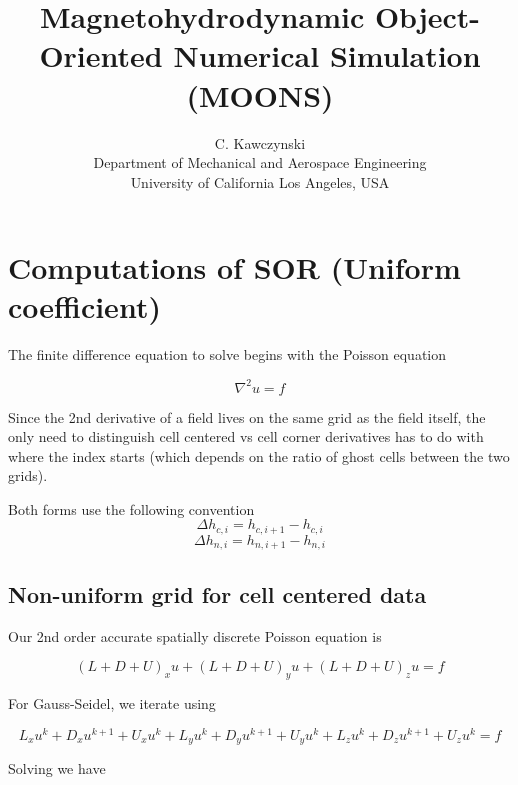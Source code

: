 \documentclass[11pt]{article}
\begin{document}
\doublespacing
\title{Magnetohydrodynamic Object-Oriented Numerical Simulation (MOONS)}
\author{C. Kawczynski \\
Department of Mechanical and Aerospace Engineering \\
University of California Los Angeles, USA\\
}
\maketitle

\section{Computations of SOR (Uniform coefficient)}
The finite difference equation to solve begins with the Poisson equation


\begin{equation}
	\nabla^2 u = f
\end{equation}

Since the 2nd derivative of a field lives on the same grid as the field itself, the only need to distinguish cell centered vs cell corner derivatives has to do with where the index starts (which depends on the ratio of ghost cells between the two grids).

Both forms use the following convention
\begin{equation}
	\Delta h_{c,i} = h_{c,i+1} - h_{c,i}
\end{equation}
\begin{equation}
	\Delta h_{n,i} = h_{n,i+1} - h_{n,i}
\end{equation}

\subsection{Non-uniform grid for cell centered data}
Our 2nd order accurate spatially discrete Poisson equation is

\begin{equation}
	(L + D + U)_x u +
	(L + D + U)_y u +
	(L + D + U)_z u
	 = f
\end{equation}

For Gauss-Seidel, we iterate using

\begin{equation}
	L_x u^{k} + D_x u^{k+1} + U_x u^{k} +
	L_y u^{k} + D_y u^{k+1} + U_y u^{k} +
	L_z u^{k} + D_z u^{k+1} + U_z u^{k}
	 = f
\end{equation}

Solving we have
\end{document}
